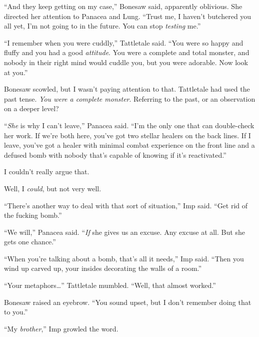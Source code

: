 ``And they keep getting on my case,'' Bonesaw said, apparently oblivious.  She directed her attention to Panacea and Lung.  ``Trust me, I haven't butchered you all yet, I'm not going to in the future.  You can stop \emph{testing} me.''



``I remember when you were cuddly,'' Tattletale said.  ``You were so happy and fluffy and you had a good \emph{attitude}.  You were a complete and total monster, and nobody in their right mind would cuddle you, but you were adorable.  Now look at you.''



Bonesaw scowled, but I wasn't paying attention to that.  Tattletale had used the past tense.  \emph{You were a complete monster}.  Referring to the past, or an observation on a deeper level?



``\emph{She} is why I can't leave,'' Panacea said.  ``I'm the only one that can double-check her work.  If we're both here, you've got two stellar healers on the back lines.  If I leave, you've got a healer with minimal combat experience on the front line and a defused bomb with nobody that's capable of knowing if it's reactivated.''



I couldn't really argue that.



Well, I \emph{could}, but not very well.



``There's another way to deal with that sort of situation,'' Imp said.  ``Get rid of the fucking bomb.''



``We will,'' Panacea said.  ``\emph{If} she gives us an excuse.  Any excuse at all.  But she gets one chance.''



``When you're talking about a bomb, that's all it needs,'' Imp said.  ``Then you wind up carved up, your insides decorating the walls of a room.''



``Your metaphors\ldots'' Tattletale mumbled.  ``Well, that almost worked.''



Bonesaw raised an eyebrow.  ``You sound upset, but I don't remember doing that to you.''



``My \emph{brother},'' Imp growled the word.




